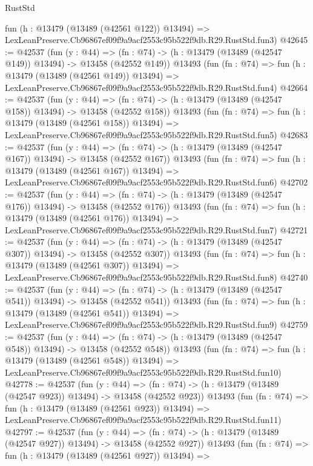 \begin{lexlean}{RustStd}
\begin{coremodule}
    fun (h : @13479 (@13489 (@42561 @122)) @13494) =>
    LexLeanPreserve.Cb96867ef09f9a9acf2553c95b522f9db.R29.RustStd.fun3)
@42645 := @42537
    (fun (y : @44) =>
    (fn : @74) -> (h : @13479 (@13489 (@42547 @149)) @13494) -> @13458 (@42552 @149))
    @13493
    (fun (fn : @74) =>
    fun (h : @13479 (@13489 (@42561 @149)) @13494) =>
    LexLeanPreserve.Cb96867ef09f9a9acf2553c95b522f9db.R29.RustStd.fun4)
@42664 := @42537
    (fun (y : @44) =>
    (fn : @74) -> (h : @13479 (@13489 (@42547 @158)) @13494) -> @13458 (@42552 @158))
    @13493
    (fun (fn : @74) =>
    fun (h : @13479 (@13489 (@42561 @158)) @13494) =>
    LexLeanPreserve.Cb96867ef09f9a9acf2553c95b522f9db.R29.RustStd.fun5)
@42683 := @42537
    (fun (y : @44) =>
    (fn : @74) -> (h : @13479 (@13489 (@42547 @167)) @13494) -> @13458 (@42552 @167))
    @13493
    (fun (fn : @74) =>
    fun (h : @13479 (@13489 (@42561 @167)) @13494) =>
    LexLeanPreserve.Cb96867ef09f9a9acf2553c95b522f9db.R29.RustStd.fun6)
@42702 := @42537
    (fun (y : @44) =>
    (fn : @74) -> (h : @13479 (@13489 (@42547 @176)) @13494) -> @13458 (@42552 @176))
    @13493
    (fun (fn : @74) =>
    fun (h : @13479 (@13489 (@42561 @176)) @13494) =>
    LexLeanPreserve.Cb96867ef09f9a9acf2553c95b522f9db.R29.RustStd.fun7)
@42721 := @42537
    (fun (y : @44) =>
    (fn : @74) -> (h : @13479 (@13489 (@42547 @307)) @13494) -> @13458 (@42552 @307))
    @13493
    (fun (fn : @74) =>
    fun (h : @13479 (@13489 (@42561 @307)) @13494) =>
    LexLeanPreserve.Cb96867ef09f9a9acf2553c95b522f9db.R29.RustStd.fun8)
@42740 := @42537
    (fun (y : @44) =>
    (fn : @74) -> (h : @13479 (@13489 (@42547 @541)) @13494) -> @13458 (@42552 @541))
    @13493
    (fun (fn : @74) =>
    fun (h : @13479 (@13489 (@42561 @541)) @13494) =>
    LexLeanPreserve.Cb96867ef09f9a9acf2553c95b522f9db.R29.RustStd.fun9)
@42759 := @42537
    (fun (y : @44) =>
    (fn : @74) -> (h : @13479 (@13489 (@42547 @548)) @13494) -> @13458 (@42552 @548))
    @13493
    (fun (fn : @74) =>
    fun (h : @13479 (@13489 (@42561 @548)) @13494) =>
    LexLeanPreserve.Cb96867ef09f9a9acf2553c95b522f9db.R29.RustStd.fun10)
@42778 := @42537
    (fun (y : @44) =>
    (fn : @74) -> (h : @13479 (@13489 (@42547 @923)) @13494) -> @13458 (@42552 @923))
    @13493
    (fun (fn : @74) =>
    fun (h : @13479 (@13489 (@42561 @923)) @13494) =>
    LexLeanPreserve.Cb96867ef09f9a9acf2553c95b522f9db.R29.RustStd.fun11)
@42797 := @42537
    (fun (y : @44) =>
    (fn : @74) -> (h : @13479 (@13489 (@42547 @927)) @13494) -> @13458 (@42552 @927))
    @13493
    (fun (fn : @74) =>
    fun (h : @13479 (@13489 (@42561 @927)) @13494) =>

\end{coremodule}
\end{lexlean}
